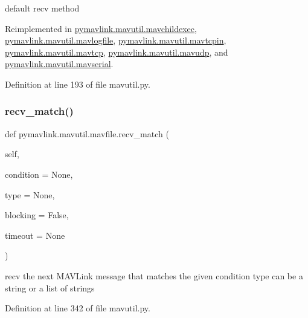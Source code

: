 \begin{DoxyVerb}default recv method\end{DoxyVerb}
 

Reimplemented in \mbox{\hyperlink{classpymavlink_1_1mavutil_1_1mavchildexec_a82bdf3a8047fb35d535a82fd85761a52}{pymavlink.\+mavutil.\+mavchildexec}}, \mbox{\hyperlink{classpymavlink_1_1mavutil_1_1mavlogfile_a3517f0936b24f1aa60ec3c90b729665e}{pymavlink.\+mavutil.\+mavlogfile}}, \mbox{\hyperlink{classpymavlink_1_1mavutil_1_1mavtcpin_a51df915724f2169ba96fd97fc0897151}{pymavlink.\+mavutil.\+mavtcpin}}, \mbox{\hyperlink{classpymavlink_1_1mavutil_1_1mavtcp_a8c56a0ee4f9c42f36534cd36bca997e1}{pymavlink.\+mavutil.\+mavtcp}}, \mbox{\hyperlink{classpymavlink_1_1mavutil_1_1mavudp_a0381f8262ab6149604e902339c5a4a53}{pymavlink.\+mavutil.\+mavudp}}, and \mbox{\hyperlink{classpymavlink_1_1mavutil_1_1mavserial_acd3d12828b5794091b0984d65c292770}{pymavlink.\+mavutil.\+mavserial}}.



Definition at line 193 of file mavutil.\+py.

\mbox{\label{classpymavlink_1_1mavutil_1_1mavfile_a7baa4911cf9de819dc682f2904bf4352}} 
\subsubsection{\texorpdfstring{recv\_match()}{recv\_match()}}
{\footnotesize\ttfamily def pymavlink.\+mavutil.\+mavfile.\+recv\+\_\+match (\begin{DoxyParamCaption}\item[{}]{self,  }\item[{}]{condition = {\ttfamily None},  }\item[{}]{type = {\ttfamily None},  }\item[{}]{blocking = {\ttfamily False},  }\item[{}]{timeout = {\ttfamily None} }\end{DoxyParamCaption})}

\begin{DoxyVerb}recv the next MAVLink message that matches the given condition
type can be a string or a list of strings\end{DoxyVerb}
 

Definition at line 342 of file mavutil.\+py.

